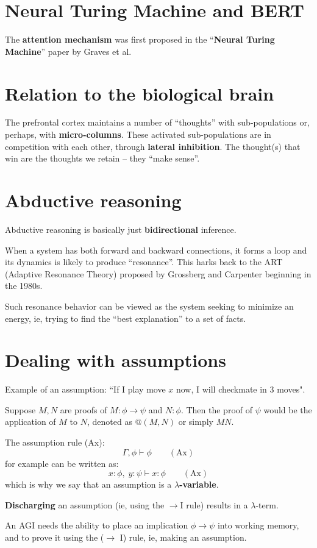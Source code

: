 \section{Neural Turing Machine and BERT}

The \textbf{attention mechanism} was first proposed in the ``\textbf{Neural Turing Machine}'' paper by Graves et al.

\section{Relation to the biological brain}

The prefrontal cortex maintains a number of ``thoughts'' with sub-populations or, perhaps, with \textbf{micro-columns}.  These activated sub-populations are in competition with each other, through \textbf{lateral inhibition}.  The thought(s) that win are the thoughts we retain -- they ``make sense''.

\section{Abductive reasoning}

Abductive reasoning is basically just \textbf{bidirectional} inference.

When a system has both forward and backward connections, it forms a loop and its dynamics is likely to produce ``resonance''.  This harks back to the ART (Adaptive Resonance Theory) proposed by Grossberg and Carpenter beginning in the 1980s.

Such resonance behavior can be viewed as the system seeking to minimize an energy, ie, trying to find the ``best explanation'' to a set of facts.  

\section{Dealing with assumptions}

Example of an assumption:  ``If I play move $x$ now, I will checkmate in 3 moves".

Suppose $M, N$ are proofs of $M: \phi \rightarrow \psi$ and $N: \phi$.  Then the proof of $\psi$ would be the application of $M$ to $N$, denoted as $@(M, N)$ or simply $M N$.

The assumption rule (Ax):
\begin{equation}
\Gamma, \phi \vdash \phi \qquad (\mbox{Ax})
\end{equation}
for example can be written as:
\begin{equation}
x : \phi, \; y : \psi \vdash x : \phi \qquad (\mbox{Ax})
\end{equation}
which is why we say that an assumption is a \textbf{$\lambda$-variable}.  

\textbf{Discharging} an assumption (ie, using the $\rightarrow$I rule) results in a $\lambda$-term.

An AGI needs the ability to place an implication $\phi \rightarrow \psi$ into working memory, and to prove it using the ($\rightarrow$ I) rule, ie, making an assumption.


